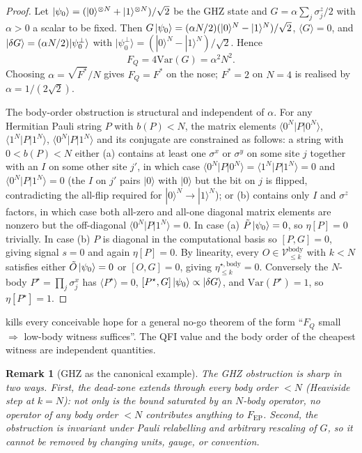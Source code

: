 \documentclass[11pt,a4paper]{article}
\newcommand{\FQ}{F_Q}
\newcommand{\FEP}{F_{\mathrm{EP}}}
\newcommand{\Var}{\mathrm{Var}}
\newcommand{\PsiZ}{\ket{\psi_0}}
\newcommand{\dG}{\ket{\delta G}}
\newcommand{\Vbody}[1]{\mathcal{V}^{\mathrm{body}}_{\le #1}}
\newcommand{\etabody}[1]{\eta^{\star,\mathrm{body}}_{\le #1}}
\newtheorem*{remark}{Remark}
\begin{document}
\begin{proof}
Let $\PsiZ=(|0\rangle^{\otimes N}+|1\rangle^{\otimes N})/\sqrt2$ be
the GHZ state and $G=\alpha\sum_j\sigma^z_j/2$ with $\alpha>0$ a
scalar to be fixed.  Then
$G\PsiZ=(\alpha N/2)(|0\rangle^N-|1\rangle^N)/\sqrt2$,
$\langle G\rangle=0$, and
$\dG=(\alpha N/2)|\psi_0^\perp\rangle$ with
$|\psi_0^\perp\rangle=(|0\rangle^N-|1\rangle^N)/\sqrt2$.  Hence
\begin{equation}
   \FQ=4\Var(G)=\alpha^2N^2.
\end{equation}
Choosing $\alpha=\sqrt{F^*}/N$ gives $\FQ=F^*$ on the nose;
$F^*=2$ on $N=4$ is realised by $\alpha=1/(2\sqrt 2)$.

The body-order obstruction is structural and independent of
$\alpha$.  For any Hermitian Pauli string $P$ with $b(P)<N$, the
matrix elements $\langle 0^N|P|0^N\rangle$,
$\langle 1^N|P|1^N\rangle$, $\langle 0^N|P|1^N\rangle$ and its
conjugate are constrained as follows: a string with
$0<b(P)<N$ either (a) contains at least one $\sigma^x$ or
$\sigma^y$ on some site $j$ together with an $I$ on some other
site $j'$, in which case
$\langle 0^N|P|0^N\rangle=\langle 1^N|P|1^N\rangle=0$ and
$\langle 0^N|P|1^N\rangle=0$ (the $I$ on $j'$ pairs $|0\rangle$
with $|0\rangle$ but the bit on $j$ is flipped, contradicting the
all-flip required for $|0\rangle^N\to|1\rangle^N$); or (b)
contains only $I$ and $\sigma^z$ factors, in which case both
all-zero and all-one diagonal matrix elements are nonzero but
the off-diagonal $\langle 0^N|P|1^N\rangle=0$.  In case (a)
$\tilde P\PsiZ=0$, so $\eta[P]=0$ trivially.  In case (b) $P$ is
diagonal in the computational basis so $[P,G]=0$, giving signal
$s=0$ and again $\eta[P]=0$.  By linearity, every
$O\in\Vbody{k}$ with $k<N$ satisfies either $\tilde O\PsiZ=0$ or
$[O,G]=0$, giving $\etabody{k}=0$.  Conversely the $N$-body
$P^\star=\prod_j\sigma^x_j$ has
$\langle P^\star\rangle=0$, $[P^\star,G]\PsiZ\propto\dG$, and
$\Var(P^\star)=1$, so $\eta[P^\star]=1$.
\end{proof}

 kills every conceivable hope for a general no-go
theorem of the form ``$\FQ$ small $\Rightarrow$ low-body witness
suffices''.  The QFI value and the body order of the cheapest
witness are independent quantities.

\begin{remark}[GHZ as the canonical example]
The GHZ obstruction is sharp in two ways.  First, the dead-zone
extends through every body order $<N$ (Heaviside step at $k=N$):
not only is the bound saturated by an $N$-body operator, no
operator of \emph{any} body order $<N$ contributes anything to
$\FEP$.  Second, the obstruction is invariant under Pauli relabelling
and arbitrary rescaling of $G$, so it cannot be removed by changing
units, gauge, or convention.
\end{remark}
\end{document}
